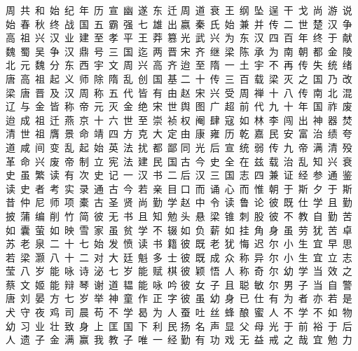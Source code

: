 周~共~和~始~纪~年~历~宣~幽~遂~东~迁
周~道~衰~王~纲~坠~逞~干~戈~尚~游~说
始~春~秋~终~战~国~五~霸~强~七~雄~出
嬴~秦~氏~始~兼~并~传~二~世~楚~汉~争
高~祖~兴~汉~业~建~至~孝~平~王~莽~篡
光~武~兴~为~东~汉~四~百~年~终~于~献
魏~蜀~吴~争~汉~鼎~号~三~国~迄~两~晋
宋~齐~继~梁~陈~承~为~南~朝~都~金~陵
北~元~魏~分~东~西~宇~文~周~兴~高~齐
迨~至~隋~一~土~宇~不~再~传~失~统~绪
唐~高~祖~起~义~师~除~隋~乱~创~国~基
二~十~传~三~百~载~梁~灭~之~国~乃~改
梁~唐~晋~及~汉~周~称~五~代~皆~有~由
赵~宋~兴~受~周~禅~十~八~传~南~北~混
辽~与~金~皆~称~帝~元~灭~金~绝~宋~世
舆~图~广~超~前~代~九~十~年~国~祚~废
迨~成~祖~迁~燕~京~十~六~世~至~崇~祯
权~阉~肆~寇~如~林~李~闯~出~神~器~焚
清~世~祖~膺~景~命~靖~四~方~克~大~定
由~康~雍~历~乾~嘉~民~安~富~治~绩~夸
道~咸~间~变~乱~起~始~英~法~扰~都~鄙
同~光~后~宣~统~弱~传~九~帝~满~清~殁
革~命~兴~废~帝~制~立~宪~法~建~民~国
古~今~史~全~在~兹~载~治~乱~知~兴~衰
史~虽~繁~读~有~次~史~记~一~汉~书~二
后~汉~三~国~志~四~兼~证~经~参~通~鉴
读~史~者~考~实~录~通~古~今~若~亲~目
口~而~诵~心~而~惟~朝~于~斯~夕~于~斯
昔~仲~尼~师~项~橐~古~圣~贤~尚~勤~学
赵~中~令~读~鲁~论~彼~既~仕~学~且~勤
披~蒲~编~削~竹~简~彼~无~书~且~知~勉
头~悬~梁~锥~刺~股~彼~不~教~自~勤~苦
如~囊~萤~如~映~雪~家~虽~贫~学~不~辍
如~负~薪~如~挂~角~身~虽~劳~犹~苦~卓
苏~老~泉~二~十~七~始~发~愤~读~书~籍
彼~既~老~犹~悔~迟~尔~小~生~宜~早~思
若~梁~灏~八~十~二~对~大~廷~魁~多~士
彼~既~成~众~称~异~尔~小~生~宜~立~志
莹~八~岁~能~咏~诗~泌~七~岁~能~赋~棋
彼~颖~悟~人~称~奇~尔~幼~学~当~效~之
蔡~文~姬~能~辩~琴~谢~道~韫~能~咏~吟
彼~女~子~且~聪~敏~尔~男~子~当~自~警
唐~刘~晏~方~七~岁~举~神~童~作~正~字
彼~虽~幼~身~已~仕~有~为~者~亦~若~是
犬~守~夜~鸡~司~晨~苟~不~学~曷~为~人
蚕~吐~丝~蜂~酿~蜜~人~不~学~不~如~物
幼~习~业~壮~致~身~上~匡~国~下~利~民
扬~名~声~显~父~母~光~于~前~裕~于~后
人~遗~子~金~满~赢~我~教~子~唯~一~经
勤~有~功~戏~无~益~戒~之~哉~宜~勉~力
